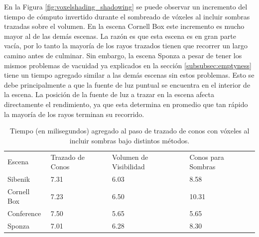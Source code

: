 En la Figura \ref{fig:voxelshading_shadowing} se puede observar un incremento del tiempo de cómputo invertido durante el sombreado de vóxeles al incluir sombras trazadas sobre el volumen. En la escena Cornell Box este incremento es mucho mayor al de las demás escenas. La razón es que esta escena es en gran parte vacía, por lo tanto la mayoría de los rayos trazados tienen que recorrer un largo camino antes de culminar. Sin embargo, la escena Sponza a pesar de tener los mismos problemas de vacuidad ya explicados en la sección \ref{subsubsec:emptyness} tiene un tiempo agregado similar a las demás escenas sin estos problemas. Esto se debe principalmente a que la fuente de luz puntual se encuentra en el interior de la escena. La posición de la fuente de luz a trazar en la escena afecta directamente el rendimiento, ya que esta determina en promedio que tan rápido la mayoría de los rayos terminan su recorrido.

\begin{table}[H]
\centering
\begin{tabular}{llll}
                                  &                                       &                                             &                                         \\ \hline
\multicolumn{1}{|l|}{Escena}      & \multicolumn{1}{l|}{Trazado de Conos} & \multicolumn{1}{l|}{Volumen de Visibilidad} & \multicolumn{1}{l|}{Conos para Sombras} \\ \hline
\multicolumn{1}{|l|}{Sibenik}     & \multicolumn{1}{l|}{7.31}             & \multicolumn{1}{l|}{6.03}                   & \multicolumn{1}{l|}{8.58}               \\
\multicolumn{1}{|l|}{Cornell Box} & \multicolumn{1}{l|}{7.23}             & \multicolumn{1}{l|}{6.50}                   & \multicolumn{1}{l|}{10.31}              \\
\multicolumn{1}{|l|}{Conference}  & \multicolumn{1}{l|}{7.50}             & \multicolumn{1}{l|}{5.65}                   & \multicolumn{1}{l|}{5.65}               \\
\multicolumn{1}{|l|}{Sponza}      & \multicolumn{1}{l|}{7.01}             & \multicolumn{1}{l|}{6.28}                   & \multicolumn{1}{l|}{8.30}               \\ \hline
\end{tabular}
\caption{Tiempo (en milisegundos) agregado al paso de trazado de conos con vóxeles al incluir sombras bajo distintos métodos.}
\label{tab:shadowcone5}
\end{table}

